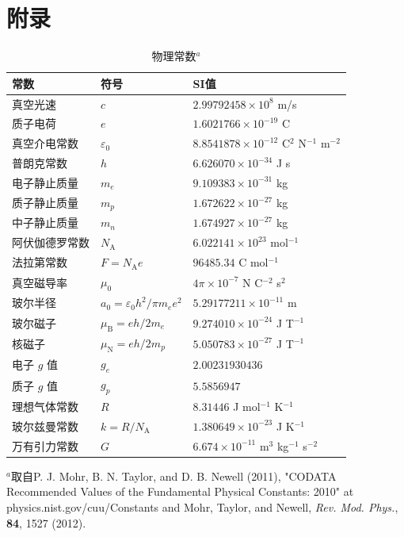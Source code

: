 \documentclass[12pt,a4paper,openany]{ctexbook}
\begin{document}
\chapter*{附录}
\begin{table}[htbp]
  \centering
  \begin{threeparttable}
    \caption{物理常数$^a$}
    \label{tabA.1}
    \begin{tabular}{l l l}
      \toprule
      常数 & 符号 & SI值 \\
      \midrule
      真空光速 & $c$ & $2.99792458 \times 10^8$ m/s \\
      质子电荷 & $e$ & $1.6021766 \times 10^{-19}$ C \\
      真空介电常数 & $\varepsilon_0$ & $8.8541878 \times 10^{-12}$ C$^2$ N$^{-1}$ m$^{-2}$ \\
      普朗克常数 & $h$ & $6.626070 \times 10^{-34}$ J s \\
      电子静止质量 & $m_e$ & $9.109383 \times 10^{-31}$ kg \\
      质子静止质量 & $m_p$ & $1.672622 \times 10^{-27}$ kg \\
      中子静止质量 & $m_n$ & $1.674927 \times 10^{-27}$ kg \\
      阿伏伽德罗常数 & $N_\text{A}$ & $6.022141 \times 10^{23}$ mol$^{-1}$ \\
      法拉第常数 & $F = N_\text{A}e$ & $96485.34$ C mol$^{-1}$ \\
      真空磁导率 & $\mu_0$ & $4\pi \times 10^{-7}$ N C$^{-2}$ s$^2$ \\
      玻尔半径 & $a_0 = \varepsilon_0 h^2 / \pi m_e e^2$ & $5.29177211 \times 10^{-11}$ m \\
      玻尔磁子 & $\mu_\text{B} = e h / 2m_e$ & $9.274010 \times 10^{-24}$ J T$^{-1}$ \\
      核磁子 & $\mu_\text{N} = e h / 2m_p$ & $5.050783 \times 10^{-27}$ J T$^{-1}$ \\
      电子 $g$ 值 & $g_e$ & $2.00231930436$ \\
      质子 $g$ 值 & $g_p$ & $5.5856947$ \\
      理想气体常数 & $R$ & $8.31446$ J mol$^{-1}$ K$^{-1}$ \\
      玻尔兹曼常数 & $k = R / N_\text{A}$ & $1.380649 \times 10^{-23}$ J K$^{-1}$ \\
      万有引力常数 & $G$ & $6.674 \times 10^{-11}$ m$^3$ kg$^{-1}$ s$^{-2}$ \\
      \bottomrule
    \end{tabular}
    \begin{tablenotes}
      \small
      \item $^a$取自P. J. Mohr, B. N. Taylor, and D. B. Newell (2011), "CODATA Recommended Values of the Fundamental Physical Constants: 2010" at physics.nist.gov/cuu/Constants and Mohr, Taylor, and Newell, \textit{Rev. Mod. Phys.}, \textbf{84}, 1527 (2012).
    \end{tablenotes}
  \end{threeparttable}
\end{table}
\end{document}
